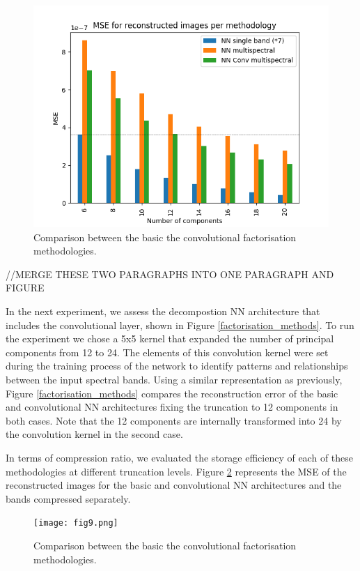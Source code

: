 \documentclass[essd, manuscript]{copernicus}
\begin{document}
\begin{figure}%
    \includegraphics[width=14cm]{fig8.png}
    \caption{Comparison between the basic the convolutional factorisation methodologies.}%
    \label{multispectral_cmp}%
\end{figure}

//MERGE THESE TWO PARAGRAPHS INTO ONE PARAGRAPH AND FIGURE

In the next experiment, we assess the decompostion NN architecture that includes the convolutional layer, shown in Figure \ref{factorisation_methods}. To run the experiment we chose a 5x5 kernel that expanded the number of principal components from 12 to 24. The elements of this convolution kernel were set during the training process of the network to identify patterns and relationships between the input spectral bands. Using a similar representation as previously, Figure \ref{factorisation_methods} compares the reconstruction error of the basic and convolutional NN architectures fixing the truncation to 12 components in both cases. Note that the 12 components are internally transformed into 24 by the convolution kernel in the second case.


In terms of compression ratio, we evaluated the storage efficiency of each of these methodologies at different truncation levels. Figure \ref{compression_cmp} represents the MSE of the reconstructed images for the basic and convolutional NN architectures and the bands compressed separately. 

\begin{figure}%
    \texttt{[image: fig9.png]}
    \caption{Comparison between the basic the convolutional factorisation methodologies.}%
    \label{compression_cmp}%
\end{figure}
\end{document}
